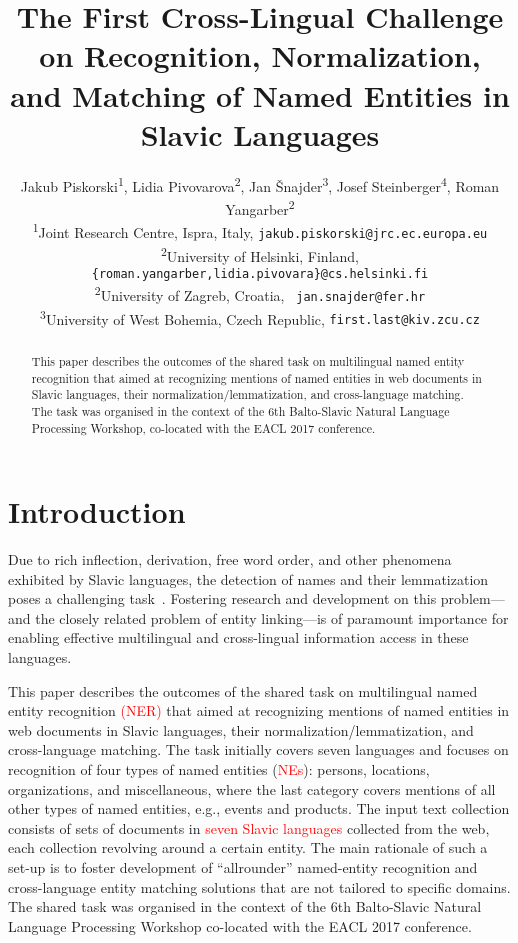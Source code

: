 \documentclass[11pt]{article}
\title{The First Cross-Lingual Challenge on Recognition,
  Normalization,  
  \\ and Matching of Named Entities in Slavic Languages}
\author{Jakub Piskorski\textsuperscript{1},
  Lidia Pivovarova\textsuperscript{2},
  Jan Šnajder\textsuperscript{3},
  Josef Steinberger\textsuperscript{4},
  Roman Yangarber\textsuperscript{2} \\
  \textsuperscript{1}Joint Research Centre,
  \comment{Via Enrico Fermi 2749, 21027}Ispra\comment{ (VA)}, Italy,
  {\small \tt jakub.piskorski@jrc.ec.europa.eu} \\
  \textsuperscript{2}University of Helsinki, Finland, {\small \tt
  \{roman.yangarber,lidia.pivovara\}@cs.helsinki.fi}\\
    \textsuperscript{2}University of Zagreb, Croatia, {\small \tt
    jan.snajder@fer.hr} \\
  \textsuperscript{3}University of West Bohemia, Czech Republic, 
  {\small \tt first.last@kiv.zcu.cz} 
  }
\date{}
\newcommand{\alert}[1]{\textcolor{red}{#1}}
\begin{document}
\maketitle
\begin{abstract}
This paper describes the outcomes of the shared task on multilingual named entity recognition 
that aimed at recognizing mentions of named entities in web documents in Slavic languages, 
their normalization/lemmatization, and cross-language matching. The task was organised in 
the context of the 6th Balto-Slavic Natural Language Processing Workshop, co-located with the 
EACL 2017 conference. 
\end{abstract}

\section{Introduction}
\label{sec:intro}

Due to rich inflection, derivation, free word order, and other phenomena
exhibited by Slavic languages, the detection of names and their
lemmatization poses a challenging task~\cite{Przepiorkowski:2007:SIE:1567545.1567547,journals/ir/PiskorskiWS09}. 
Fostering research and development on this problem---and the closely related problem of entity
linking---is of paramount importance for enabling effective multilingual
and cross-lingual information access in these languages.

This paper describes the outcomes of the shared task on multilingual named 
entity recognition \alert{(NER)} that aimed at recognizing mentions of named entities in web documents 
in Slavic languages, their normalization/lemmatization, and cross-language matching.
The task initially covers seven languages and focuses on recognition of four types of 
named entities (\alert{NEs}): persons, locations, organizations, and miscellaneous,
where the last category covers mentions of all other types of named entities, e.g., events and products.
The input text collection consists of sets of documents in \alert{seven Slavic languages} collected from the 
web, each collection revolving around a certain entity. The main rationale of such a 
set-up is to foster development of ``allrounder'' named-entity recognition and 
cross-language entity matching solutions that are not tailored to specific domains.
The shared task was organised in the context of the 6th Balto-Slavic Natural Language Processing 
Workshop co-located with the EACL 2017 conference. 
\end{document}

